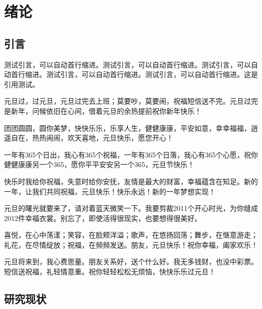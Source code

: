 
\chapter{绪论}

\section{引言}

测试引言，可以自动首行缩进。测试引言，可以自动首行缩进。测试引言，可以自动首行缩进。测试引言，可以自动首行缩进。测试引言，可以自动首行缩进。这是引用测试\cite{barnes2009patchmatch}\cite{barnes2009patchmatch2}\cite{barnes2009patchmatch3}\cite{barnes2009patchmatch4}\cite{barnes2009patchmatch5}\cite{barnes2009patchmatch6}\cite{barnes2009patchmatch7}\cite{barnes2009patchmatch8}\cite{barnes2009patchmatch9}\cite{barnes2009patchmatch10}\cite{barnes2009patchmatch11}\cite{barnes2009patchmatch12}\cite{barnes2009patchmatch13}\cite{barnes2009patchmatch14}\cite{barnes2009patchmatch15}\cite{barnes2009patchmatch16}\cite{barnes2009patchmatch17}\cite{barnes2009patchmatch18}。

元旦过，过元旦，元旦过完去上班；莫要吵，莫要闹，祝福短信送不完。元旦过完是新年，问候依旧在心间，借着元旦的余热提前祝你新年快乐！

团团圆圆，圆你美梦，快快乐乐，乐享人生，健健康康，平安如意，幸幸福福，逍遥自在，热热闹闹，欢天喜地，元旦快乐，愿您开心！

一年有365个日出，我心有365个祝福，一年有365个日落，我心有365个心愿，祝你健健康康另一个365，愿你平平安安另一个365，元旦节快乐！

快乐时我给你祝福，失意时给你安抚，友情是最大的财富，幸福蕴含在知足。新的一年，让我们共同祝福，元旦快乐！快乐永远！新的一年梦想实现！

元旦的曙光就要来了，请对着蓝天微笑一下。我要剪裁2011个开心时光，为你缝成2012件幸福衣裳。别忘了，即使活得很现实，也要想得很美好。

喜悦，在心中荡漾；笑容，在脸颊洋溢；歌声，在悠扬回荡；舞步，在惬意游走；礼花，在尽情绽放；祝福，在频频发送。朋友，元旦快乐！祝你幸福，阖家欢乐！

元旦将来到，我心费思量。朋友关系好，送个什么好。我无多钱财，也没中彩票。短信送祝福，礼轻情意重。祝你轻轻松松无烦恼，快快乐乐过元旦！

\section{研究现状}

